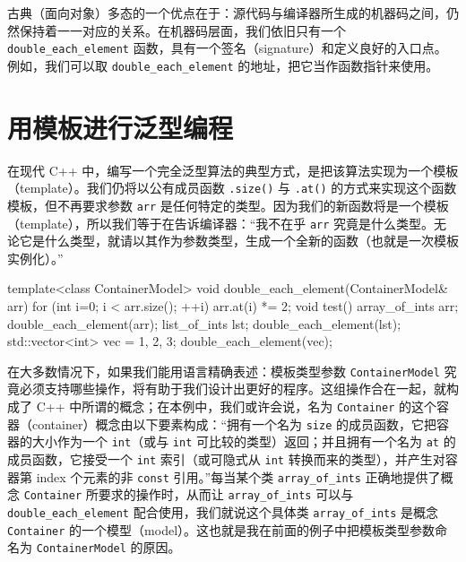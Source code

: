 古典（面向对象）多态的一个优点在于：源代码与编译器所生成的机器码之间，仍然保持着一一对应的关系。在机器码层面，我们依旧只有一个 \texttt{double\_\allowbreak{}each\_\allowbreak{}element} 函数，具有一个签名（signature）和定义良好的入口点。例如，我们可以取 \texttt{double\_\allowbreak{}each\_\allowbreak{}element} 的地址，把它当作函数指针来使用。

\section{用模板进行泛型编程}

在现代 C++ 中，编写一个完全泛型算法的典型方式，是把该算法实现为一个模板（template）。我们仍将以公有成员函数 \texttt{.size(\allowbreak{})\allowbreak{}} 与 \texttt{.at(\allowbreak{})\allowbreak{}} 的方式来实现这个函数模板，但不再要求参数 \texttt{arr} 是任何特定的类型。因为我们的新函数将是一个模板（template），所以我们等于在告诉编译器：“我不在乎 \texttt{arr} 究竟是什么类型。无论它是什么类型，就请以其作为参数类型，生成一个全新的函数（也就是一次模板实例化）。”

\begin{codebox}[cpp]
    template<class ContainerModel>
    void double_each_element(ContainerModel& arr)
    {
      for (int i=0; i < arr.size(); ++i) {
        arr.at(i) *= 2;
      }
    }
    void test()
    {
      array_of_ints arr;
      double_each_element(arr);
      list_of_ints lst;
      double_each_element(lst);
      std::vector<int> vec = {1, 2, 3};
      double_each_element(vec);
    }
\end{codebox}

在大多数情况下，如果我们能用语言精确表述：模板类型参数 \texttt{Container\allowbreak{}Model} 究竟必须支持哪些操作，将有助于我们设计出更好的程序。这组操作合在一起，就构成了 C++ 中所谓的概念；在本例中，我们或许会说，名为 \texttt{Container} 的这个容器（container）概念由以下要素构成：“拥有一个名为 \texttt{size} 的成员函数，它把容器的大小作为一个 \texttt{int}（或与 \texttt{int} 可比较的类型）返回；并且拥有一个名为 \texttt{at} 的成员函数，它接受一个 \texttt{int} 索引（或可隐式从 \texttt{int} 转换而来的类型），并产生对容器第 index 个元素的非 \texttt{const} 引用。”每当某个类 \texttt{array\_\allowbreak{}of\_\allowbreak{}ints} 正确地提供了概念 \texttt{Container} 所要求的操作时，从而让 \texttt{array\_\allowbreak{}of\_\allowbreak{}ints} 可以与 \texttt{double\_\allowbreak{}each\_\allowbreak{}element} 配合使用，我们就说这个具体类 \texttt{array\_\allowbreak{}of\_\allowbreak{}ints} 是概念 \texttt{Container} 的一个模型（model）。这也就是我在前面的例子中把模板类型参数命名为 \texttt{Container\allowbreak{}Model} 的原因。

